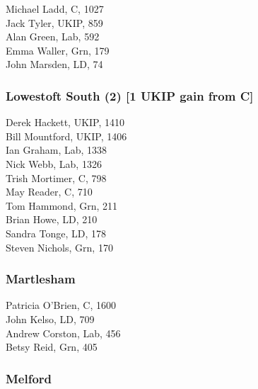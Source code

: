 \documentclass[a4paper,openany,10pt]{book}
\begin{document}


Michael Ladd, C, 1027\\
Jack Tyler, UKIP, 859\\
Alan Green, Lab, 592\\
Emma Waller, Grn, 179\\
John Marsden, LD, 74\\


\subsubsection*{Lowestoft South (2) \hspace*{\fill}\nolinebreak[1]%
\enspace\hspace*{\fill}
[1 UKIP gain from C]}



Derek Hackett, UKIP, 1410\\
Bill Mountford, UKIP, 1406\\
Ian Graham, Lab, 1338\\
Nick Webb, Lab, 1326\\
Trish Mortimer, C, 798\\
May Reader, C, 710\\
Tom Hammond, Grn, 211\\
Brian Howe, LD, 210\\
Sandra Tonge, LD, 178\\
Steven Nichols, Grn, 170\\


\subsubsection*{Martlesham}



Patricia O'Brien, C, 1600\\
John Kelso, LD, 709\\
Andrew Corston, Lab, 456\\
Betsy Reid, Grn, 405\\


\subsubsection*{Melford}

\end{document}
